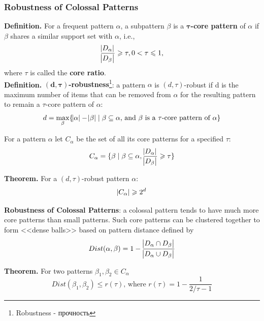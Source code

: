\subsubsection{Robustness of Colossal Patterns}
\textbf{Definition.} For a frequent pattern $\alpha$, a subpattern $\beta$ is a $\mathbf{\tau}$\textbf{-core pattern} of $\alpha$ if $\beta$ shares a similar support set with $\alpha$, i.e., 
\begin{equation*}
\frac{\abs{D_\alpha}}{\abs{D_\beta}} \geqslant \tau, 0 < \tau \leqslant 1, 
\end{equation*}
where $\tau$ is called the \textbf{core ratio}.\\

\textbf{Definition.} \textbf{$\mathbf{(d, \tau)}$-robustness}\footnote{Robustness - прочность}: a pattern $\alpha$ is $(d, \tau)$-robust if d is the maximum number of items that can be removed from $\alpha$ for the resulting pattern to remain a $\tau$-core pattern of $\alpha$:
\begin{equation*}
d = \max_{\beta}\{\abs{\alpha} - \abs{\beta} \mid \beta \subseteq \alpha\text{, and }\beta\text{ is a }\tau\text{-core pattern of }\alpha\}
\end{equation*}

For a pattern $\alpha$ let $C_\alpha$ be the set of all its core patterns for a specified $\tau$:
\begin{equation*}
C_\alpha = \{\beta \mid \beta \subseteq \alpha, \frac{\abs{D_\alpha}}{\abs{D_\beta}} \geqslant \tau\}
\end{equation*}

\textbf{Theorem.} For a $(d, \tau)$-robust pattern $\alpha$:
\begin{equation*}
\abs{C_\alpha} \geqslant 2^d
\end{equation*}

\textbf{Robustness of Colossal Patterns}: a colossal pattern tends to have
much more core patterns than small patterns. Such core patterns can be clustered together to form <<dense balls>> based on pattern distance defined by 
\begin{equation*}
Dist(\alpha, \beta)=1-\frac{\abs{D_\alpha \cap D_\beta}}{\abs{D_\alpha \cup D_\beta}}
\end{equation*}

\textbf{Theorem.} For two patterns $\beta_1, \beta_2 \in C_\alpha$ 
\begin{equation*}
Dist(\beta_1, \beta_2) \leqslant r(\tau)\text{, where }r(\tau)=1-\frac{1}{2/\tau-1}
\end{equation*}

